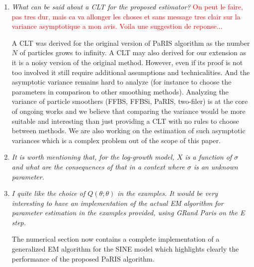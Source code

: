 \documentclass[12pt]{article}
\newcommand{\1}{\mathrm{1}}
\begin{document}
\begin{enumerate}
\item {\em What can be said about a CLT for the proposed estimator?}
\textcolor{red}{On peut le faire, pas tres dur, mais ca va allonger les choses et sans message tres clair sur la variance asymptotique a mon avis. Voila une suggestion de reponse...}

\vspace{.3cm}

A CLT was derived for the original version of PaRIS algorithm as the number $N$ of particles grows to infinity. A CLT may also derived for our extension as it is a noisy version of the original method. However, even if its proof is not too involved it still require additional assumptions and technicalities. And the asymptotic variance remains hard to analyze (for instance to choose the parameters in comparison to other smoothing methods). Analyzing the variance of particle smoothers (FFBS, FFBSi, PaRIS, two-filer) is at the core of ongoing works and we believe that comparing the variance would be more suitable and interesting than just providing a CLT with no rules to choose between methods. We are also working on the estimation of such asymptotic variances which is a complex problem out of the scope of this paper.

\item {\em It is worth mentioning that, for the log-growth model, $X$ is a function of $\sigma$ and what
are the consequences of that in a context where $\sigma$ is an unknown parameter.}

\vspace{.3cm}

\item {\em I quite like the choice of $Q(\theta;\theta)$ in the examples. It would be very interesting to
have an implementation of the actual EM algorithm for parameter estimation in the
examples provided, using GRand Paris on the E step.}

\vspace{.3cm}

The numerical section now contains a complete implementation of a generalized EM algorithm for the SINE model which highlights clearly the performance of the proposed PaRIS algorithm.  
\end{enumerate}
\end{document}
